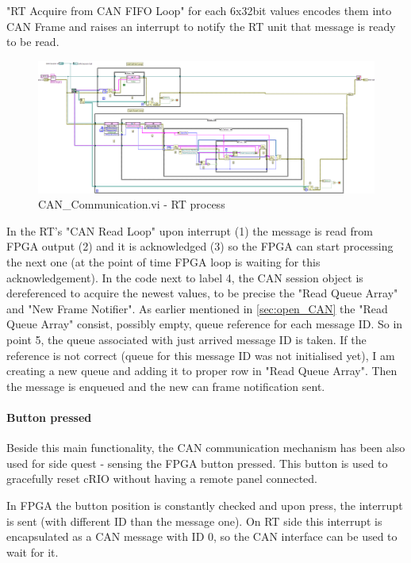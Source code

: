 "RT Acquire from CAN FIFO Loop" for each 6x32bit values encodes them into CAN Frame and raises an interrupt to notify the RT unit that message is ready to be read. 
\begin{figure}[H]
    \centering
    \includegraphics[scale=\visc,max width=\textwidth]{figures/CAN_Communicationd_e}
    \caption{CAN\_Communication.vi - RT process}
    \label{vi:CAN_Communication}
\end{figure}
In the RT's "CAN Read Loop" upon interrupt (1) the message is read from FPGA output (2) and it is acknowledged (3) so the FPGA can start processing the next one (at the point of time FPGA loop is waiting for this acknowledgement). In the code next to label 4, the CAN session object is dereferenced to acquire the newest values, to be precise the "Read Queue Array" and "New Frame Notifier". As earlier mentioned in \ref{sec:open_CAN} the "Read Queue Array" consist, possibly empty, queue reference for each message ID. So in point 5, the queue associated with just arrived message ID is taken. If the reference is not correct (queue for this message ID was not initialised yet), I am creating a new queue and adding it to proper row in "Read Queue Array". Then the message is enqueued and the new can frame notification sent.

\paragraph{Button pressed}
Beside this main functionality, the CAN communication mechanism has been also used for side quest - sensing the FPGA button pressed. This button is used to gracefully reset cRIO without having a remote panel connected.

In FPGA the button position is constantly checked and upon press, the interrupt is sent (with different ID than the message one). On RT side this interrupt is encapsulated as a CAN message with ID 0, so the CAN interface can be used to wait for it.
